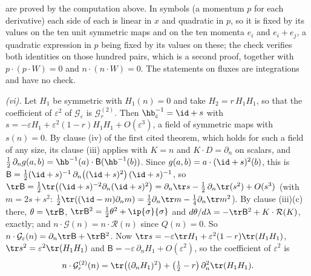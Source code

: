 are proved by the computation above. In symbols (a momentum $p$ for each derivative) each side of each is linear in $x$ and quadratic in $p$, so it is fixed by its values on the ten unit symmetric maps and on the ten momenta $e_{i}$ and $e_{i} + e_{j}$, a quadratic expression in $p$ being fixed by its values on these; the check verifies both identities on those hundred pairs, which is a second proof, together with $p \cdot (p \cdot W) = 0$ and $n \cdot (n \cdot W) = 0$. The statements on fluxes are integrations and have no check.

\emph{(vi).} Let $H_{1}$ be symmetric with $H_{1}(n) = 0$ and take $H_{2} = r\,H_{1}H_{1}$, so that the coefficient of $\varepsilon^{2}$ of $\mathcal{G}_{\varepsilon}$ is $\mathcal{G}^{(2)}_{r}$. Then $\hb_{\varepsilon}^{-1} = \id + s$ with $s = -\varepsilon H_{1} + \varepsilon^{2}(1 - r)H_{1}H_{1} + O(\varepsilon^{3})$, a field of symmetric maps with $s(n) = 0$. By clause (iv) of the first cited theorem, which holds for such a field of any size, its clause (iii) applies with $K = n$ and $K \cdot D = \partial_{n}$ on scalars, and $\tfrac12\,\partial_{n}g(a, b) = \hb^{-1}(a) \cdot \mathsf{B}(\hb^{-1}(b))$. Since $g(a, b) = a \cdot (\id + s)^{2}(b)$, this is $\mathsf{B} = \tfrac12(\id + s)^{-1}\,\partial_{n}\bigl((\id + s)^{2}\bigr)\,(\id + s)^{-1}$, so $\tr\mathsf{B} = \tfrac12\tr\bigl((\id + s)^{-2}\partial_{n}(\id + s)^{2}\bigr) = \partial_{n}\tr s - \tfrac12\,\partial_{n}\tr(s^{2}) + O(s^{3})$ (with $m = 2s + s^{2}$: $\tfrac12\tr((\id - m)\partial_{n}m) = \tfrac12\partial_{n}\tr m - \tfrac14\partial_{n}\tr m^{2}$). By clause (iii)(c) there, $\theta = \tr\mathsf{B}$, $\tr\mathsf{B}^{2} = \tfrac12\theta^{2} + \ip{\sigma}{\sigma}$ and $d\theta/d\lambda = -\tr\mathsf{B}^{2} + K \cdot \mathcal{R}(K)$, exactly; and $n \cdot \mathcal{G}(n) = n \cdot \mathcal{R}(n)$ since $Q(n) = 0$. So $n \cdot \mathcal{G}_{\varepsilon}(n) = \partial_{n}\tr\mathsf{B} + \tr\mathsf{B}^{2}$. Now $\tr s = -\varepsilon\tr H_{1} + \varepsilon^{2}(1 - r)\tr(H_{1}H_{1})$, $\tr s^{2} = \varepsilon^{2}\tr(H_{1}H_{1})$ and $\mathsf{B} = -\varepsilon\,\partial_{n}H_{1} + O(\varepsilon^{2})$, so the coefficient of $\varepsilon^{2}$ is
\[
n \cdot \mathcal{G}^{(2)}_{r}(n) = \tr\bigl((\partial_{n}H_{1})^{2}\bigr) + \bigl(\tfrac12 - r\bigr)\,\partial_{n}^{2}\tr(H_{1}H_{1}) .
\]
